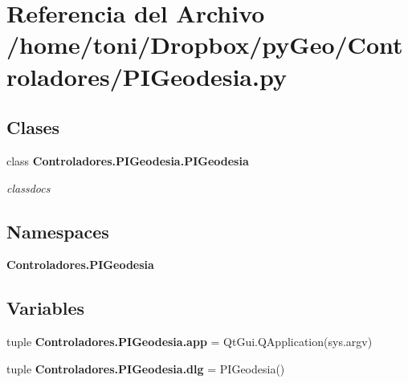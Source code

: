 \section{Referencia del Archivo /home/toni/\-Dropbox/py\-Geo/\-Controladores/\-P\-I\-Geodesia.py}
\label{Controladores_2PIGeodesia_8py}
\subsection*{Clases}
\begin{DoxyCompactItemize}
\item 
class {\bf Controladores.\-P\-I\-Geodesia.\-P\-I\-Geodesia}
\begin{DoxyCompactList}\small\item\em classdocs \end{DoxyCompactList}\end{DoxyCompactItemize}
\subsection*{Namespaces}
\begin{DoxyCompactItemize}
\item 
{\bf Controladores.\-P\-I\-Geodesia}
\end{DoxyCompactItemize}
\subsection*{Variables}
\begin{DoxyCompactItemize}
\item 
tuple {\bf Controladores.\-P\-I\-Geodesia.\-app} = Qt\-Gui.\-Q\-Application(sys.\-argv)
\item 
tuple {\bf Controladores.\-P\-I\-Geodesia.\-dlg} = P\-I\-Geodesia()
\end{DoxyCompactItemize}
